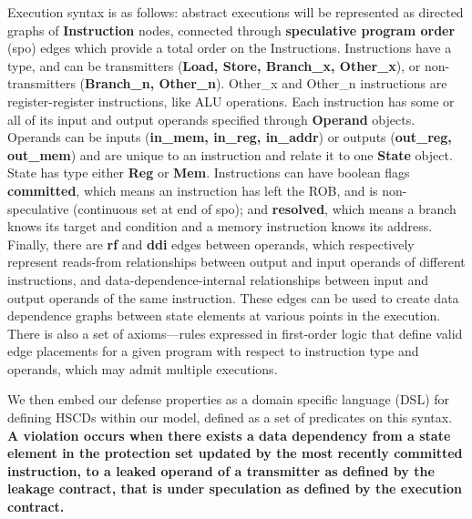 Execution syntax is as follows: abstract executions will be represented as directed  graphs of \textbf{Instruction} nodes, connected through \textbf{speculative program order} (spo) edges which provide a total order on the Instructions. Instructions have a type, and can be transmitters (\textbf{Load, Store, Branch\_x, Other\_x}), or non-transmitters (\textbf{Branch\_n, Other\_n}). Other\_x and Other\_n instructions are register-register instructions, like ALU operations. Each instruction has some or all of its input and output operands specified through \textbf{Operand} objects. Operands can be inputs (\textbf{in\_mem, in\_reg, in\_addr}) or outputs (\textbf{out\_reg, out\_mem}) and are unique to an instruction and relate it to one \textbf{State} object. State has type either \textbf{Reg} or \textbf{Mem}. Instructions can have boolean flags \textbf{committed}, which means an instruction has left the ROB, and is non-speculative (continuous set at end of spo); and \textbf{resolved}, which means a branch knows its target and condition and a memory instruction knows its address. Finally, there are \textbf{rf} and \textbf{ddi} edges between operands, which respectively represent reads-from relationships between output and input operands of different instructions, and data-dependence-internal relationships between input and output operands of the same instruction. These edges can be used to create data dependence graphs between state elements at various points in the execution. There is also a set of axioms—rules expressed in first-order logic that define valid edge placements for a given program with respect to instruction type and operands, which may admit multiple executions. 

We then embed our defense properties as a domain specific language (DSL) for defining HSCDs within our model, defined as a set of predicates on this syntax. \textbf{A \textbf{violation} occurs when there exists a data dependency from a state element in the \textbf{protection set} updated by the most recently committed instruction, to a leaked operand of a transmitter as defined by the \textbf{leakage contract}, that is under speculation as defined by the \textbf{execution contract}. }

